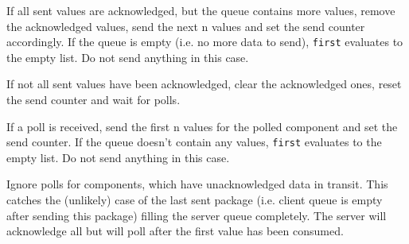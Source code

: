 \documentclass{report}
\begin{document}
\begin{mathpar}
\end{mathpar}
If all sent values are acknowledged, but the queue contains more values, remove the acknowledged values, send the next n values and set the send counter accordingly. If the queue is empty (i.e. no more data to send), \texttt{first} evaluates to the empty list. Do not send anything in this case.

\begin{mathpar}
\end{mathpar}
If not all sent values have been acknowledged, clear the acknowledged ones, reset the send counter and wait for polls.

\begin{mathpar}
\end{mathpar}
If a poll is received, send the first n values for the polled component and set the send counter. If the queue doesn't contain any values, \texttt{first} evaluates to the empty list. Do not send anything in this case.

\begin{mathpar}
\end{mathpar}
Ignore polls for components, which have unacknowledged data in transit. This catches the (unlikely) case of the last sent package (i.e. client queue is empty after sending this package) filling the server queue completely. The server will acknowledge all but will poll after the first value has been consumed.

\end{document}
